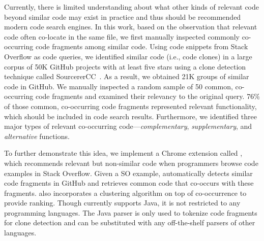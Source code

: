 Currently, there is limited understanding about what other kinds of relevant code beyond similar code
may exist in practice and thus should be recommended modern code search engines. 
In this work, based on the observation that relevant code often co-locate in the same file, we first manually 
inspected commonly co-occurring code fragments among similar code.  Using code snippets from Stack Overflow
as code queries, we identified similar code (i.e., code clones) in a large corpus of 50K GitHub projects with 
at least five stars using a clone detection technique called SourcererCC~\cite{sajnani2016sourcerercc}. 
As a result, we obtained 21K groups of similar code in GitHub. We manually inspected a random sample of 50 common, co-occurring code fragments and examined their relevancy to the original query. 
76\% of those common, co-occurring code fragments represented relevant functionality, 
which should be included in code search results. 
Furthermore, we identified three major types of relevant co-occurring code---{\em complementary}, {\em supplementary}, and {\em alternative} functions.



 To further demonstrate this idea, we implement a Chrome extension called {\tool}, which recommends relevant but non-similar code when programmers browse code examples in Stack Overflow. Given a SO example, {\tool} automatically detects similar code fragments in GitHub and retrieves common code that co-occurs with these fragments. {\tool} also incorporates a clustering algorithm on top of co-occurrence to provide ranking. Though {\tool} currently supports Java, it is not restricted to any programming languages. The Java parser is only used to tokenize code fragments for clone detection and can be substituted with any off-the-shelf parsers of other languages.
 
